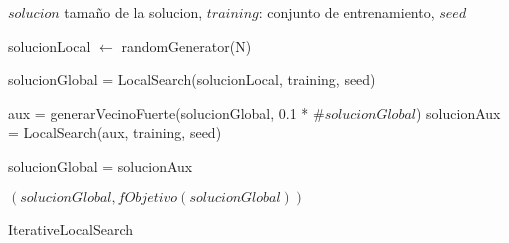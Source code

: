 \documentclass{article}
\begin{document}
\begin{algorithm}
\begin{algorithmic}[1]
    \REQUIRE $solucion$ tamaño de la solucion, $training$: conjunto de entrenamiento, $seed$

	\STATE solucionLocal $\leftarrow$ randomGenerator(N)

	\STATE solucionGlobal = LocalSearch(solucionLocal, training, seed)


	\STATE aux = generarVecinoFuerte(solucionGlobal, 0.1 * $\#solucionGlobal$)
	\STATE solucionAux = LocalSearch(aux, training, seed)

		\STATE solucionGlobal = solucionAux
	\ENDIF

    \ENDFOR

    \RETURN $(solucionGlobal, fObjetivo(solucionGlobal))$
\end{algorithmic}
\caption{IterativeLocalSearch}
\end{algorithm}
\end{document}
